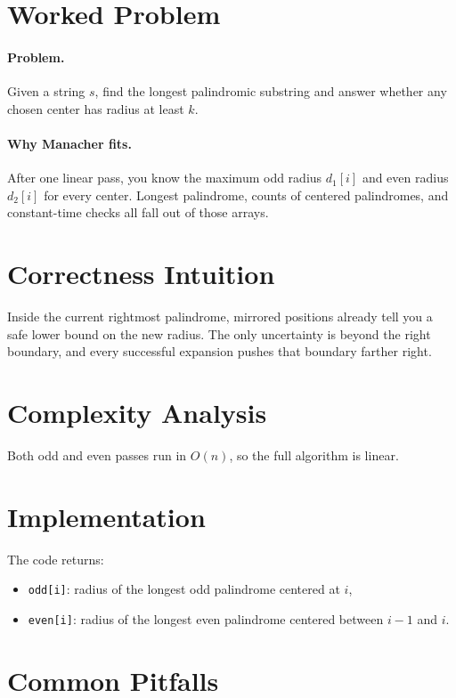 \section*{Worked Problem}

\paragraph{Problem.}
Given a string \(s\), find the longest palindromic substring and answer whether any chosen center has radius at least
\(k\).

\paragraph{Why Manacher fits.}
After one linear pass, you know the maximum odd radius \(d_1[i]\) and even radius \(d_2[i]\) for every center. Longest
palindrome, counts of centered palindromes, and constant-time checks all fall out of those arrays.

\section*{Correctness Intuition}

Inside the current rightmost palindrome, mirrored positions already tell you a safe lower bound on the new radius. The
only uncertainty is beyond the right boundary, and every successful expansion pushes that boundary farther right.

\section*{Complexity Analysis}

Both odd and even passes run in \(O(n)\), so the full algorithm is linear.

\section*{Implementation}

The code returns:

\begin{itemize}
  \item \texttt{odd[i]}: radius of the longest odd palindrome centered at \(i\),
  \item \texttt{even[i]}: radius of the longest even palindrome centered between \(i-1\) and \(i\).
\end{itemize}

\section*{Common Pitfalls}

